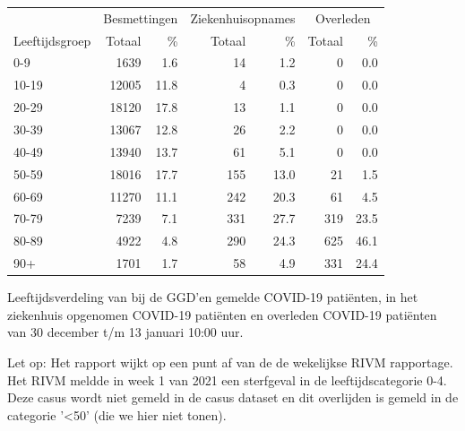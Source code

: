 \documentclass[
  english,
  man,floatsintext]{apa6}
\begin{document}
\begin{table}[H]
\centering\begingroup\fontsize{11}{13}\selectfont

\begin{threeparttable}
\begin{tabular}{lrrrrrr}
\toprule
\multicolumn{1}{c}{ } & \multicolumn{2}{c}{Besmettingen} & \multicolumn{2}{c}{Ziekenhuisopnames} & \multicolumn{2}{c}{Overleden} \\
\cmidrule(l{3pt}r{3pt}){2-3} \cmidrule(l{3pt}r{3pt}){4-5} \cmidrule(l{3pt}r{3pt}){6-7}
Leeftijdsgroep & Totaal & \% & Totaal & \% & Totaal & \%\\
\midrule
0-9 & 1639 & 1.6 & 14 & 1.2 & 0 & 0.0\\
10-19 & 12005 & 11.8 & 4 & 0.3 & 0 & 0.0\\
20-29 & 18120 & 17.8 & 13 & 1.1 & 0 & 0.0\\
30-39 & 13067 & 12.8 & 26 & 2.2 & 0 & 0.0\\
40-49 & 13940 & 13.7 & 61 & 5.1 & 0 & 0.0\\
50-59 & 18016 & 17.7 & 155 & 13.0 & 21 & 1.5\\
60-69 & 11270 & 11.1 & 242 & 20.3 & 61 & 4.5\\
70-79 & 7239 & 7.1 & 331 & 27.7 & 319 & 23.5\\
80-89 & 4922 & 4.8 & 290 & 24.3 & 625 & 46.1\\
90+ & 1701 & 1.7 & 58 & 4.9 & 331 & 24.4\\
\bottomrule
\end{tabular}
\begin{tablenotes}
\item[1] Leeftijdsverdeling van bij de GGD’en gemelde COVID-19 patiënten, in het ziekenhuis opgenomen COVID-19 patiënten en overleden COVID-19 patiënten van 30 december t/m 13 januari 10:00 uur.
\item[2] Let op: Het rapport wijkt op een punt af van de de wekelijkse RIVM rapportage. Het RIVM meldde in week 1 van 2021 een sterfgeval in de leeftijdscategorie 0-4. Deze casus wordt niet gemeld in de casus dataset en dit overlijden is gemeld in de categorie '<50' (die we hier niet tonen).
\end{tablenotes}
\end{threeparttable}
\endgroup{}
\end{table}

\newpage
\end{document}
